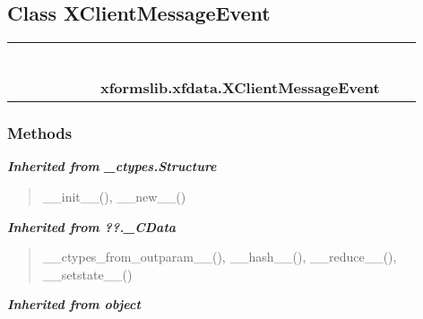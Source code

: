 \subsection{Class XClientMessageEvent}

    \label{xformslib:xfdata:XClientMessageEvent}
\begin{tabular}{cccccccccc}
\multicolumn{2}{r}{\settowidth{\BCL}{object}\multirow{2}{\BCL}{object}}
&&
&&
&&
  \\\cline{3-3}
  &&\multicolumn{1}{c|}{}
&&
&&
&&
  \\
\multicolumn{4}{r}{\settowidth{\BCL}{??.\_CData}\multirow{2}{\BCL}{??.\_CData}}
&&
&&
  \\\cline{5-5}
  &&&&\multicolumn{1}{c|}{}
&&
&&
  \\
\multicolumn{6}{r}{\settowidth{\BCL}{\_ctypes.Structure}\multirow{2}{\BCL}{\_ctypes.Structure}}
&&
  \\\cline{7-7}
  &&&&&&\multicolumn{1}{c|}{}
&&
  \\
&&&&&&\multicolumn{2}{l}{\textbf{xformslib.xfdata.XClientMessageEvent}}
\end{tabular}



  \subsubsection{Methods}


\large{\textbf{\textit{Inherited from \_ctypes.Structure}}}

\begin{quote}
\_\_init\_\_(), \_\_new\_\_()
\end{quote}

\large{\textbf{\textit{Inherited from ??.\_CData}}}

\begin{quote}
\_\_ctypes\_from\_outparam\_\_(), \_\_hash\_\_(), \_\_reduce\_\_(), \_\_setstate\_\_()
\end{quote}

\large{\textbf{\textit{Inherited from object}}}

